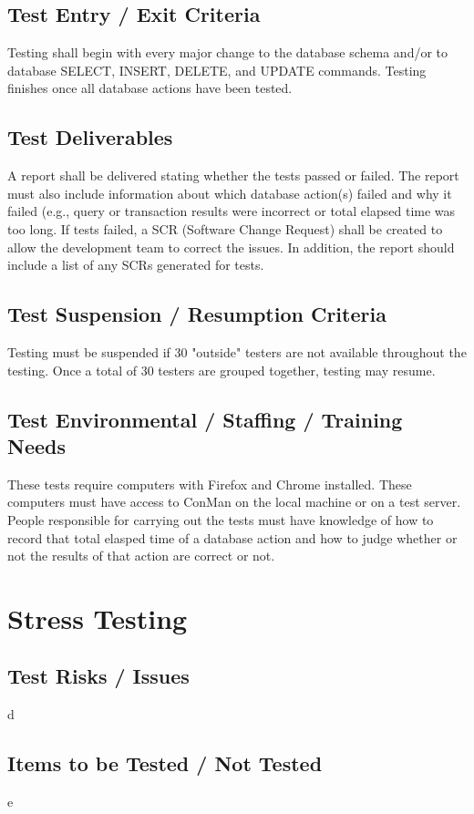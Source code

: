 \documentclass{article}
\begin{document}
\subsection{Test Entry / Exit Criteria}
Testing shall begin with every major change to the database schema and/or to database SELECT, 
INSERT, DELETE, and UPDATE commands. Testing finishes once all database actions have been 
tested. 

\subsection{Test Deliverables}
A report shall be delivered stating whether the tests passed or failed. The report 
must also include information about which database action(s) failed and why it failed (e.g., 
query or transaction results were incorrect or total elapsed time was too long. If tests 
failed, a SCR (Software Change Request) shall be created to allow the development 
team to correct the issues. In addition, the report should include a list of any 
SCRs generated for tests.

\subsection{Test Suspension / Resumption Criteria}
Testing must be suspended if 30 "outside" testers are not available throughout the 
testing. Once a total of 30 testers are grouped together, testing may resume.

\subsection{Test Environmental / Staffing / Training Needs}
These tests require computers with Firefox and Chrome installed. These computers must
have access to ConMan on the local machine or on a test server. People responsible for
carrying out the tests must have knowledge of how to record that total elasped time 
of a database action and how to judge whether or not the results of that action are 
correct or not.

\newpage
\section{Stress Testing}
\subsection{Test Risks / Issues}
d

\subsection{Items to be Tested / Not Tested}
e
\end{document}
